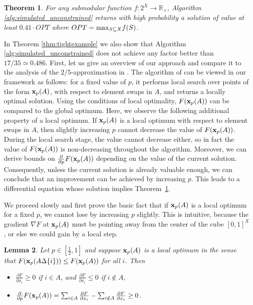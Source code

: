 \documentclass{article}[11pt]
\newtheorem{theorem}{Theorem}[section]
\newtheorem{lemma}[theorem]{Lemma}
\newcommand{\partdiff}[2]{\frac{\partial {#1}}{\partial {#2}}}
\def\bx{{\bf x}}
\def\RR{{\mathbb R}}
\def\max{{\rm{max}}}
\begin{document}
\begin{theorem}
\label{thm:0.41-approx}
For any submodular function $f:2^X \rightarrow \RR_+$, Algorithm \ref{alg:simulated_unconstrained} returns with
high probability a solution of value
at least $0.41 \cdot OPT$ where $OPT = \max_{S \subseteq X} f(S)$.
\end{theorem}
In Theorem \ref{thm:tightexample} we also show that Algorithm \ref{alg:simulated_unconstrained}
does not achieve any factor better than $17/35 \simeq 0.486$.
First, let us give an overview of our approach
and compare it to the analysis of the $2/5$-approximation in \cite{FMV07}.
The algorithm of \cite{FMV07}
can be viewed in our framework as follows: for a fixed value of $p$, it performs local search
over points of the form $\bx_p(A)$, with respect to element swaps in $A$,
and returns a locally optimal solution. Using the conditions of local optimality,
$F(\bx_p(A))$ can be compared to the global optimum.
Here, we observe the following additional property of a local optimum.
If $\bx_p(A)$ is a local optimum
with respect to element swaps in $A$, then slightly increasing $p$ cannot decrease the value
of $F(\bx_p(A))$. 
During the local search stage, the value cannot decrease either,
so in fact the value of $F(\bx_p(A))$ is non-decreasing throughout the algorithm.
Moreover, we can derive bounds on $\partdiff{}{p} F(\bx_p(A))$ depending
on the value of the current solution. Consequently,
unless the current solution is already valuable enough, we can conclude that an improvement
can be achieved by increasing $p$.
This leads to a differential equation whose solution implies Theorem~\ref{thm:0.41-approx}.

We proceed slowly and first prove the basic fact that if $\bx_p(A)$ is
a local optimum for a fixed $p$, we cannot lose by increasing $p$ slightly.
This is intuitive, because the gradient $\nabla F$ at $\bx_p(A)$
must be pointing away from the center of the cube $[0,1]^X$, or else we could gain
by a local step.

\begin{lemma}
\label{lem:positive-drift}
Let $p \in [\frac12,1]$ and suppose $\bx_p(A)$ is a local optimum in the sense that
$F(\bx_p(A \Delta \{i\})) \leq F(\bx_p(A))$ for all $i$. Then
\begin{itemize}
\item $\partdiff{F}{x_i} \geq 0$ if $i \in A$,
and $\partdiff{F}{x_i} \leq 0$ if $i \notin A$,
\item $\partdiff{}{p} F(\bx_p(A))
 = \sum_{i \in A} \partdiff{F}{x_i} - \sum_{i \notin A} \partdiff{F}{x_i} \geq 0$.
\end{itemize}
\end{lemma}
\end{document}
